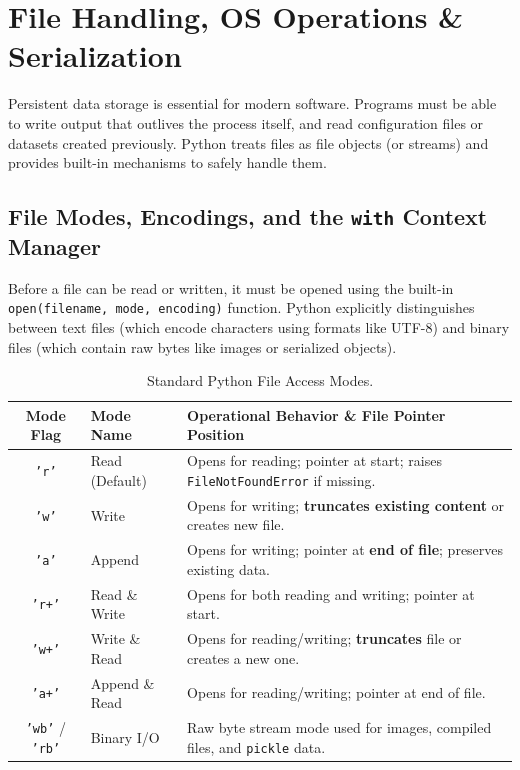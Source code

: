 \section{File Handling, OS Operations \& Serialization}

Persistent data storage is essential for modern software. Programs must be able to write output that outlives the process itself, and read configuration files or datasets created previously. Python treats files as file objects (or streams) and provides built-in mechanisms to safely handle them.

\subsection{File Modes, Encodings, and the \texttt{with} Context Manager}

Before a file can be read or written, it must be opened using the built-in \texttt{open(filename, mode, encoding)} function. Python explicitly distinguishes between text files (which encode characters using formats like UTF-8) and binary files (which contain raw bytes like images or serialized objects). 

\begin{table}[htbp]
\centering
\small
\renewcommand{\arraystretch}{1.3}
\begin{tabularx}{\linewidth}{cl>{\raggedright\arraybackslash}X}
\toprule
\textbf{Mode Flag} & \textbf{Mode Name} & \textbf{Operational Behavior \& File Pointer Position} \\
\midrule
\texttt{'r'} & Read (Default) & Opens for reading; pointer at start; raises \texttt{FileNotFoundError} if missing. \\
\texttt{'w'} & Write & Opens for writing; \textbf{truncates existing content} or creates new file. \\
\texttt{'a'} & Append & Opens for writing; pointer at \textbf{end of file}; preserves existing data. \\
\texttt{'r+'} & Read \& Write & Opens for both reading and writing; pointer at start. \\
\texttt{'w+'} & Write \& Read & Opens for reading/writing; \textbf{truncates} file or creates a new one. \\
\texttt{'a+'} & Append \& Read & Opens for reading/writing; pointer at end of file. \\
\texttt{'wb'} / \texttt{'rb'} & Binary I/O & Raw byte stream mode used for images, compiled files, and \texttt{pickle} data. \\
\bottomrule
\end{tabularx}
\caption{Standard Python File Access Modes.}
\label{tab:file-modes}
\end{table}

